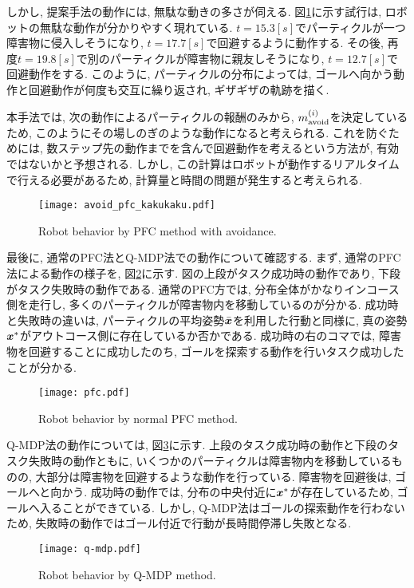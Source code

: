 しかし, 提案手法の動作には, 無駄な動きの多さが伺える. 
図\ref{fig:avoid pfc kakukaku}に示す試行は, ロボットの無駄な動作が分かりやすく現れている. 
$t=15.3[\si{s}]$でパーティクルが一つ障害物に侵入しそうになり, $t=17.7[\si{s}]$で回避するように動作する. 
その後, 再度$t=19.8[\si{s}]$で別のパーティクルが障害物に親友しそうになり, $t=12.7[\si{s}]$で回避動作をする. 
このように, パーティクルの分布によっては, ゴールへ向かう動作と回避動作が何度も交互に繰り返され, ギザギザの軌跡を描く. 

本手法では, 次の動作によるパーティクルの報酬のみから, $m^{(i)}_{\rm avoid}$を決定しているため, 
このようにその場しのぎのような動作になると考えられる. 
これを防ぐためには, 数ステップ先の動作までを含んで回避動作を考えるという方法が, 有効ではないかと予想される. 
しかし, この計算はロボットが動作するリアルタイムで行える必要があるため, 計算量と時間の問題が発生すると考えられる. 

\begin{figure}[tbp]
  \begin{center}
    \texttt{[image: avoid\_pfc\_kakukaku.pdf]}
    \caption{Robot behavior by PFC method with avoidance.}
    \label{fig:avoid pfc kakukaku}
  \end{center}
\end{figure}

最後に, 通常のPFC法とQ-MDP法での動作について確認する. 
まず, 通常のPFC法による動作の様子を, 図\ref{fig:pfc}に示す. 
図の上段がタスク成功時の動作であり, 下段がタスク失敗時の動作である. 
通常のPFC方では, 分布全体がかなりインコース側を走行し, 多くのパーティクルが障害物内を移動しているのが分かる. 
成功時と失敗時の違いは, パーティクルの平均姿勢$\bar{\boldsymbol{x}}$を利用した行動と同様に, 真の姿勢$\boldsymbol{x}^{*}$がアウトコース側に存在しているか否かである. 
成功時の右のコマでは, 障害物を回避することに成功したのち, ゴールを探索する動作を行いタスク成功したことが分かる. 

\begin{figure}[tbp]
  \begin{center}
    \texttt{[image: pfc.pdf]}
    \caption{Robot behavior by normal PFC method.}
    \label{fig:pfc}
  \end{center}
\end{figure}

Q-MDP法の動作については, 図\ref{fig:q-mdp}に示す. 
上段のタスク成功時の動作と下段のタスク失敗時の動作ともに, いくつかのパーティクルは障害物内を移動しているものの, 
大部分は障害物を回避するような動作を行っている. 
障害物を回避後は, ゴールへと向かう. 
成功時の動作では, 分布の中央付近に$\boldsymbol{x}^{*}$が存在しているため, ゴールへ入ることができている. 
しかし, Q-MDP法はゴールの探索動作を行わないため, 失敗時の動作ではゴール付近で行動が長時間停滞し失敗となる. 

\begin{figure}[tbp]
  \begin{center}
    \texttt{[image: q-mdp.pdf]}
    \caption{Robot behavior by Q-MDP method.}
    \label{fig:q-mdp}
  \end{center}
\end{figure}

